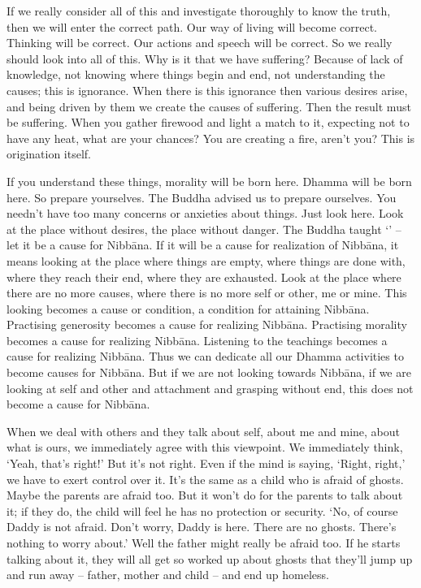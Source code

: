 If we really consider all of this and investigate thoroughly to know the truth, then we will enter the correct path. Our way of living will become correct. Thinking will be correct. Our actions and speech will be correct. So we really should look into all of this. Why is it that we have suffering? Because of lack of knowledge, not knowing where things begin and end, not understanding the causes; this is ignorance. When there is this ignorance then various desires arise, and being driven by them we create the causes of suffering. Then the result must be suffering. When you gather firewood and light a match to it, expecting not to have any heat, what are your chances? You are creating a fire, aren't you? This is origination itself. 

If you understand these things, morality will be born here. Dhamma will be born here. So prepare yourselves. The Buddha advised us to prepare ourselves. You needn't have too many concerns or anxieties about things. Just look here. Look at the place without desires, the place without danger. The Buddha taught `' -- let it be a cause for Nibb\=ana. If it will be a cause for realization of Nibb\=ana, it means looking at the place where things are empty, where things are done with, where they reach their end, where they are exhausted. Look at the place where there are no more causes, where there is no more self or other, me or mine. This looking becomes a cause or condition, a condition for attaining Nibb\=ana. Practising generosity becomes a cause for realizing Nibb\=ana. Practising morality becomes a cause for realizing Nibb\=ana. Listening to the teachings becomes a cause for realizing Nibb\=ana. Thus we can dedicate all our Dhamma activities to become causes for Nibb\=ana. But if we are not looking towards Nibb\=ana, if we are looking at self and other and attachment and grasping without end, this does not become a cause for Nibb\=ana. 

When we deal with others and they talk about self, about me and mine, about what is ours, we immediately agree with this viewpoint. We immediately think, `Yeah, that's right!' But it's not right. Even if the mind is saying, `Right, right,' we have to exert control over it. It's the same as a child who is afraid of ghosts. Maybe the parents are afraid too. But it won't do for the parents to talk about it; if they do, the child will feel he has no protection or security. `No, of course Daddy is not afraid. Don't worry, Daddy is here. There are no ghosts. There's nothing to worry about.' Well the father might really be afraid too. If he starts talking about it, they will all get so worked up about ghosts that they'll jump up and run away -- father, mother and child -- and end up homeless. 

